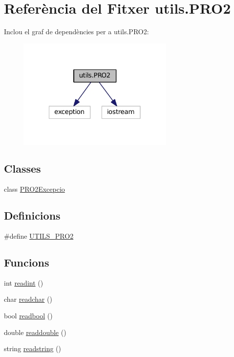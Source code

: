 \hypertarget{utils_8_p_r_o2}{\section{Referència del Fitxer utils.\-P\-R\-O2}
\label{utils_8_p_r_o2}
}
Inclou el graf de dependències per a utils.\-P\-R\-O2\-:
\nopagebreak
\begin{figure}[H]
\begin{center}
\leavevmode
\includegraphics[width=219pt]{utils_8_p_r_o2__incl}
\end{center}
\end{figure}
\subsection*{Classes}
\begin{DoxyCompactItemize}
\item 
class \hyperlink{class_p_r_o2_excepcio}{P\-R\-O2\-Excepcio}
\end{DoxyCompactItemize}
\subsection*{Definicions}
\begin{DoxyCompactItemize}
\item 
\#define \hyperlink{utils_8_p_r_o2_a8610c03aa2297bae1b7872a63c84b353}{U\-T\-I\-L\-S\-\_\-\-P\-R\-O2}
\end{DoxyCompactItemize}
\subsection*{Funcions}
\begin{DoxyCompactItemize}
\item 
int \hyperlink{utils_8_p_r_o2_a49000a716e38017061f71cbefe697a9c}{readint} ()
\item 
char \hyperlink{utils_8_p_r_o2_a831a2329c820ba9b9b378131ed143ff5}{readchar} ()
\item 
bool \hyperlink{utils_8_p_r_o2_a56691e176645da552c107ef124ad701a}{readbool} ()
\item 
double \hyperlink{utils_8_p_r_o2_a2379d4429b4e913e714a3c889061c61c}{readdouble} ()
\item 
string \hyperlink{utils_8_p_r_o2_a0785c313e983db73f256ae0ccf34591c}{readstring} ()
\end{DoxyCompactItemize}


